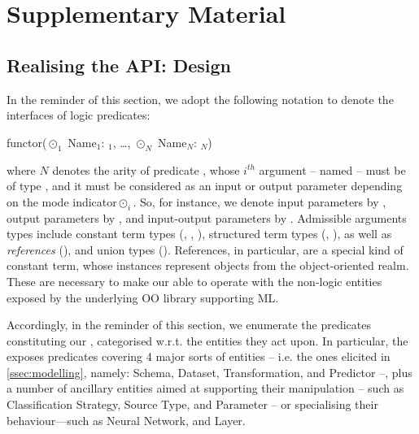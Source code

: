 \documentclass{article}
\begin{document}



\newpage

\appendix

\section{Supplementary Material}

\subsection{Realising the API: \mllib{} Design}
\label{sec:project}

%
In the reminder of this section, we adopt the following notation to denote the interfaces of logic predicates:
%
\begin{lp}
    functor($\odot_1$ Name$_1$: $_1$, \ldots, $\odot_N$ Name$_N$: $_N$)
\end{lp}
%
where $N$ denotes the arity of predicate , whose $i^{th}$ argument -- named  -- must be of type , and it must be considered as an input or output parameter depending on the mode indicator\footnotemark $\odot_i$.
%
%
So, for instance, we denote input parameters by \pl{+}, output parameters by \pl{-}, and input-output parameters by .
%
Admissible arguments types include constant term types (, , ), structured term types (, ), as well as \emph{references} (), and union types ().
%
References, in particular, are a special kind of constant term, whose instances represent objects from the object-oriented realm.
%
These are necessary to make our \mllib{} able to operate with the non-logic entities exposed by the underlying OO library supporting ML.

Accordingly, in the reminder of this section, we enumerate the predicates constituting our \mllib{}, categorised w.r.t. the entities they act upon.
%
In particular, the \mllib{} exposes predicates covering 4 major sorts of entities -- i.e. the ones elicited in \cref{ssec:modelling}, namely: Schema, Dataset, Transformation, and Predictor --, plus a number of ancillary entities aimed at supporting their manipulation -- such as Classification Strategy, Source Type, and Parameter -- or specialising their behaviour---such as Neural Network, and Layer.
\end{document}
